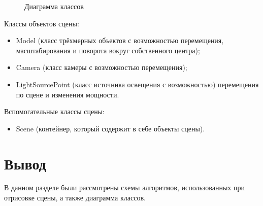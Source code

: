 \begin{figure}[ph!]
	\caption{Диаграмма классов}
	\label{fig:diag_class}
\end{figure}

Классы объектов сцены:
\begin{itemize}
	\item Model (класс трёхмерных объектов с возможностью перемещения, масштабирования и поворота вокруг собственного центра);
	\item Camera (класс камеры с возможностью перемещения);
	\item LightSourcePoint (класс источника освещения с возможностью)
	перемещения по сцене и изменения мощности.
\end{itemize}

Вспомогательные классы сцены:
\begin{itemize}
	\item  Scene (контейнер, который содержит в себе объекты сцены).
\end{itemize}

\section*{Вывод}
В данном разделе были рассмотрены схемы алгоритмов, использованных при отрисовке сцены, а также диаграмма классов.


